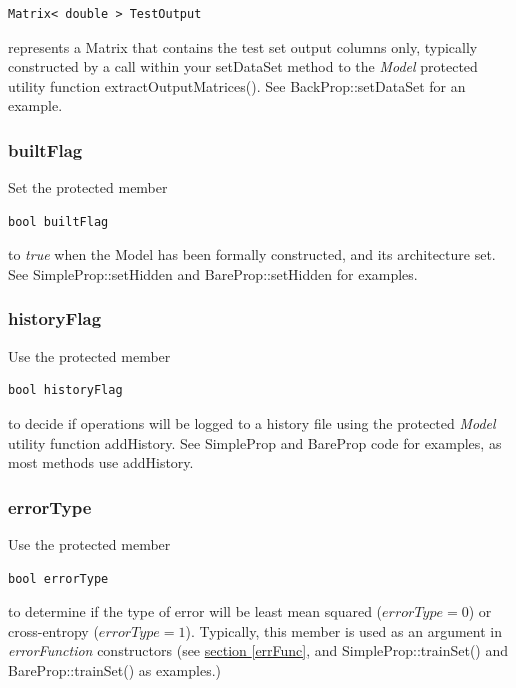 \documentclass{report}
\begin{document}
\begin{verbatim}
Matrix< double > TestOutput
\end{verbatim}

represents a Matrix that contains the test set output columns only,
typically constructed by a call within your setDataSet method to the
{\em Model} protected utility function extractOutputMatrices().  See
BackProp::setDataSet for an example.

\subsubsection{builtFlag}

Set the protected member
\begin{verbatim}
bool builtFlag
\end{verbatim}

to {\em true} when the Model has been formally constructed, and its
architecture set.  See SimpleProp::setHidden and BareProp::setHidden
for examples.

\subsubsection{historyFlag}

Use the protected member

\begin{verbatim}
bool historyFlag
\end{verbatim}

to decide if operations will be logged to a history file using the
protected {\em Model} utility function addHistory.  See SimpleProp and
BareProp code for examples, as most methods use addHistory.

\subsubsection{errorType}

Use the protected member

\begin{verbatim}
bool errorType
\end{verbatim}

to determine if the type of error will be least mean squared
($errorType = 0$) or cross-entropy ($errorType = 1$).
Typically, this member is used as an argument in {\em errorFunction}
constructors (see \hyperref[errFunc]{section \ref{errFunc}}, and
SimpleProp::trainSet() and BareProp::trainSet() as examples.)
\end{document}
